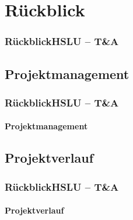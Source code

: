 \section{Rückblick}

\author{Erivn Mazlagi\'c}

\begin{frame}
	\frametitle{Rückblick\hfill{}\footnotesize HSLU -- T\&A}
	
\end{frame}

\subsection{Projektmanagement}
\begin{frame}
	\frametitle{Rückblick\hfill{}\footnotesize HSLU -- T\&A}
	\framesubtitle{Projektmanagement}
\end{frame}

\subsection{Projektverlauf}
\begin{frame}
	\frametitle{Rückblick\hfill{}\footnotesize HSLU -- T\&A}
	\framesubtitle{Projektverlauf}
\end{frame}
